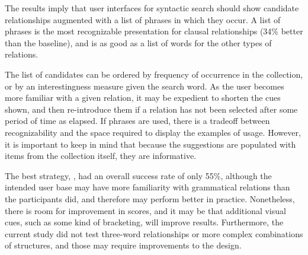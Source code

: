 

The results imply that user interfaces for syntactic search should show candidate relationships augmented with a list of phrases in which they occur. A list of phrases is the most recognizable presentation for clausal relationships (34\% better than the baseline), and is as good as a list of words for the other types of relations.

The list of candidates can be ordered by frequency of occurrence in the collection, or by an interestingness measure given the search word.  As the user becomes more familiar with a given relation, it may  be expedient to shorten the cues shown, and then re-introduce them if a relation has not been selected after some period of time as elapsed. If phrases are used, there is a tradeoff between recognizability and the space required to display the examples of usage. However, it is important to keep in mind that because the suggestions are populated with items from the collection itself, they are informative.


The best  strategy, , had an overall success rate of only 55\%, although the intended user base may have more familiarity with grammatical relations than the participants did, and therefore may perform better in practice.
Nonetheless, there is room for improvement in scores, and it may be that additional visual cues, such as some kind of bracketing, will improve results.  Furthermore, the current study did not test three-word relationships or more complex combinations of structures, and those may require improvements to the design.